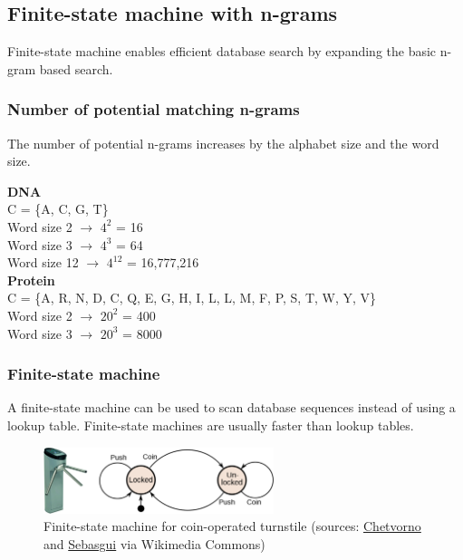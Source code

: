 %
% 

%
%
\subsection{Finite-state machine with n-grams}
Finite-state machine enables efficient database search by expanding the basic n-gram based search.

%
%
\subsubsection*{Number of potential matching n-grams} 
The number of potential n-grams increases by the alphabet size and the word size.

\medskip 

\noindent
\textbf{DNA} \\
C = \{A, C, G, T\} \\
Word size 2  $\rightarrow$ $4^2$ = 16 \\
Word size 3  $\rightarrow$ $4^3$ = 64 \\
Word size 12  $\rightarrow$ $4^{12}$ = 16,777,216 \\

\noindent
\textbf{Protein} \\
C = \{A, R, N, D, C, Q, E, G, H, I, L, L, M, F, P, S, T, W, Y, V\} \\
Word size 2  $\rightarrow$ $20^2$ = 400 \\
Word size 3  $\rightarrow$ $20^3$ = 8000

%
%
\subsubsection*{Finite-state machine} 
A finite-state machine can be used to scan database sequences instead of using a lookup table. Finite-state machines are usually faster than lookup tables.

\begin{figure}[H]
  \centering
      \includegraphics[width=0.6\textwidth]{fig05/fsm_turnstile.png}
  \caption{Finite-state machine for coin-operated turnstile  \newline (sources: \href{https://commons.wikimedia.org/w/index.php?curid=20269475}{Chetvorno} and \href{https://commons.wikimedia.org/w/index.php?curid=8930080}{Sebasgui} via Wikimedia Commons)}
\end{figure}

